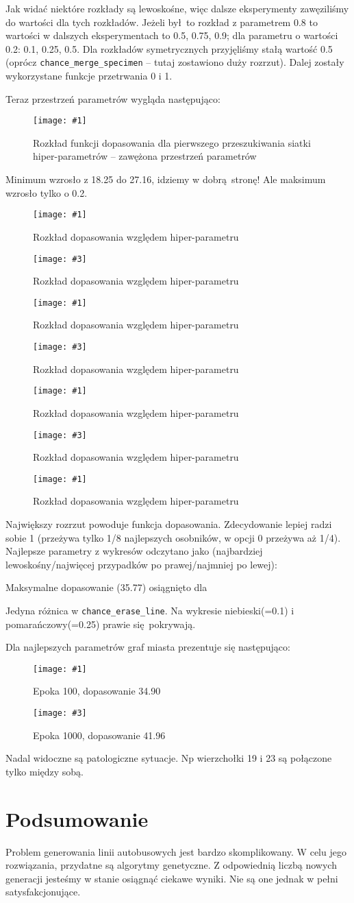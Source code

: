 \documentclass[12pt,a4paper,openright]{mwrep}
\newcommand{\imgcustomsize}[3]{
	\begin{figure}[H]
		\centering
		\texttt{[image: \#1]}
		\caption{#2}
	\end{figure}
}
\newcommand{\img}[2]{\imgcustomsize{#1}{#2}{0.8}}
\newcommand{\imgsidebyside}[4]{
	\begin{figure}[H]
		\centering
		\begin{minipage}{.45\textwidth}
			\centering
			\texttt{[image: \#1]}
			\caption{#2}
		\end{minipage}%
		\hfill
		\begin{minipage}{.45\textwidth}
			\centering
			\texttt{[image: \#3]}
			\caption{#4}
		\end{minipage}
	\end{figure}
}
\begin{document}
Jak widać niektóre rozkłady są lewoskośne, więc dalsze eksperymenty zawęziliśmy do wartości dla tych rozkładów. Jeżeli był to rozkład z parametrem 0.8 to wartości w dalszych eksperymentach to 0.5, 0.75, 0.9; dla parametru o wartości 0.2: 0.1, 0.25, 0.5. Dla rozkładów symetrycznych przyjęliśmy stałą wartość 0.5 (oprócz \lstinline|chance_merge_specimen| -- tutaj zostawiono duży rozrzut). Dalej zostały wykorzystane funkcje przetrwania 0 i 1.

Teraz przestrzeń parametrów wygląda następująco:


\img{gs2/all}{Rozkład funkcji dopasowania dla pierwszego przeszukiwania siatki hiper-parametrów -- zawężona przestrzeń parametrów}

Minimum wzrosło z 18.25 do 27.16, idziemy w dobrą stronę! Ale maksimum wzrosło tylko o 0.2.

\imgsidebyside{gs2/1}{Rozkład dopasowania względem hiper-parametru}{gs2/2}{Rozkład dopasowania względem hiper-parametru}
\imgsidebyside{gs2/3}{Rozkład dopasowania względem hiper-parametru}{gs2/4}{Rozkład dopasowania względem hiper-parametru}
\imgsidebyside{gs2/5}{Rozkład dopasowania względem hiper-parametru}{gs2/6}{Rozkład dopasowania względem hiper-parametru}
\imgcustomsize{gs2/7}{Rozkład dopasowania względem hiper-parametru}{0.5}

Największy rozrzut powoduje funkcja dopasowania. Zdecydowanie lepiej radzi sobie 1 (przeżywa tylko 1/8 najlepszych osobników, w opcji 0 przeżywa aż 1/4). Najlepsze parametry z wykresów odczytano jako (najbardziej lewoskośny/najwięcej przypadków po prawej/najmniej po lewej):


Maksymalne dopasowanie (35.77) osiągnięto dla


Jedyna różnica w \lstinline|chance_erase_line|. Na wykresie niebieski(=0.1) i pomarańczowy(=0.25) prawie się pokrywają.

Dla najlepszych parametrów graf miasta prezentuje się następująco:
\imgsidebyside{best_params_hp3}{Epoka 100, dopasowanie 34.90}{best_params_hp3_1000}{Epoka 1000, dopasowanie 41.96}

Nadal widoczne są patologiczne sytuacje. Np wierzchołki 19 i 23 są połączone tylko między sobą.

\chapter{Podsumowanie}

Problem generowania linii autobusowych jest bardzo skomplikowany. W celu jego rozwiązania, przydatne są algorytmy genetyczne. Z odpowiednią liczbą nowych generacji jesteśmy w stanie osiągnąć ciekawe wyniki. Nie są one jednak w pełni satysfakcjonujące.
\end{document}
